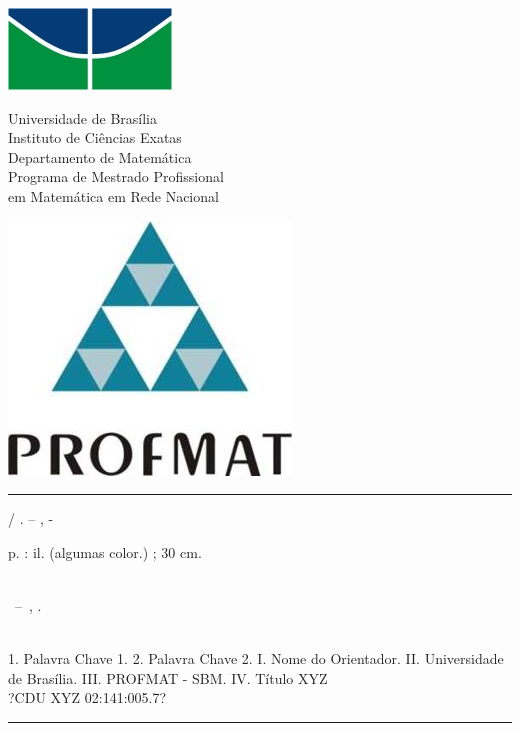 \documentclass[12pt, openright, a4paper, brazil, english, french, spanish, bibjustif, openany, oneside]{abntex2}
\renewcommand{\imprimircapa}{%
  \begin{capa}%
    \center
    \begin{minipage}[t][1cm][c]{0.2\textwidth}
        \includegraphics[scale=0.6,keepaspectratio=true]{unb.png}
    \end{minipage}
    \begin{minipage}[t][1cm][c]{0.5\textwidth}
        \begin{center}
        Universidade de Brasília \\
        Instituto de Ciências Exatas \\
        Departamento de Matemática \\
        Programa de Mestrado Profissional\\
        em Matemática em Rede Nacional
        \end{center}
    \end{minipage}
    \begin{minipage}[t][1cm][c]{0.2\textwidth}
        \includegraphics[scale=0.6,keepaspectratio=true]{profmat.jpg}
    \end{minipage}

    \vspace*{1cm}

    \vfill
    \begin{center}
    \ABNTEXchapterfont\bfseries\LARGE\imprimirtitulo
    \end{center}
    \vfill

    {\ABNTEXchapterfont\large\imprimirautor}

    \vspace*{2cm}

    \large\imprimirlocal

    \large\imprimirdata

    \vspace*{1cm}
  \end{capa}
}
\begin{document}


\frenchspacing 
\imprimircapa
\imprimirfolhaderosto*
\ABNTEXchapterfont


\begin{fichacatalografica}
	\vspace*{\fill}					%
	\hrule							%
	\begin{center}					%
	\begin{minipage}[c]{12.5cm}		%

	\imprimirautor
	
	\hspace{0.5cm} \imprimirtitulo  / \imprimirautor. --
	\imprimirlocal, \imprimirdata-
	
	\hspace{0.5cm} \pageref{LastPage} p. : il. (algumas color.) ; 30 cm.\\
	
	\hspace{0.5cm} \imprimirorientadorRotulo~\imprimirorientador\\
	
	\hspace{0.5cm}
	\parbox[t]{\textwidth}{\imprimirtipotrabalho~--~\imprimirinstituicao,
	\imprimirdata.}\\
	
	\hspace{0.5cm}
		1. Palavra Chave 1.
		2. Palavra Chave 2.
		I. Nome do Orientador.
		II. Universidade de Brasília.
		III. PROFMAT - SBM.
		IV. Título XYZ\\ 			
	
	\hspace{8.75cm} ?CDU XYZ 02:141:005.7?\\
	
	\end{minipage}
	\end{center}
	\hrule
\end{fichacatalografica}

\end{document}
